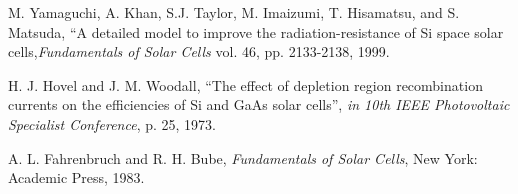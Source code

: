 \documentclass[conference]{IEEEtran}
\begin{document}











%
%
%
\begin{thebibliography}{1}
\small

M. Yamaguchi, A. Khan, S.J. Taylor, M. Imaizumi, T. Hisamatsu, and S. Matsuda, ``A detailed model to improve the radiation-resistance of Si space solar cells,\emph{Fundamentals of Solar Cells} vol. 46, pp. 2133-2138, 1999.

H. J. Hovel and J. M. Woodall, ``The effect of depletion region recombination currents on the efficiencies of Si and GaAs solar cells'', \emph {in 10th IEEE Photovoltaic Specialist Conference}, p. 25, 1973.

A. L. Fahrenbruch and R. H. Bube, \emph{Fundamentals of Solar Cells}, New York: Academic Press, 1983.


\end{thebibliography}





\end{document}
